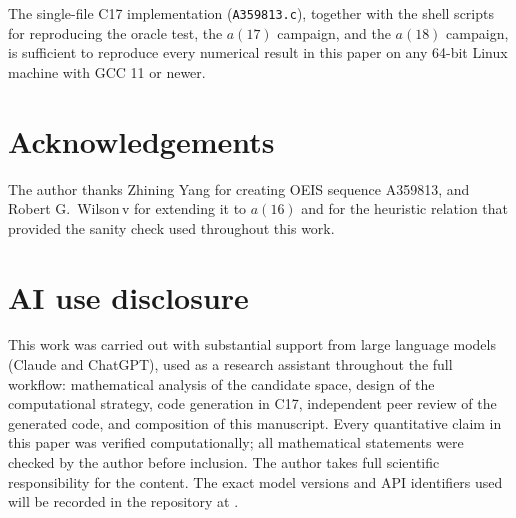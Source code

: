 \documentclass[11pt,a4paper]{article}
\theoremstyle{definition}
\begin{document}
The single-file C17 implementation (\texttt{A359813.c}), together with the
shell scripts for reproducing the oracle test, the $a(17)$ campaign, and
the $a(18)$ campaign, is sufficient to reproduce every numerical result
in this paper on any 64-bit Linux machine with GCC 11 or newer.

\section*{Acknowledgements}

The author thanks Zhining Yang for creating OEIS sequence A359813,
and Robert G.\ Wilson\,v for extending it to $a(16)$ and for the
heuristic relation that provided the sanity check used throughout this
work.

\section*{AI use disclosure}

This work was carried out with substantial support from large language
models (Claude and ChatGPT), used as a research assistant
throughout the full workflow: mathematical analysis of the candidate
space, design of the computational strategy, code generation in C17,
independent peer review of the generated code, and composition of this
manuscript. Every quantitative claim in this paper was verified
computationally; all mathematical statements were checked by the author
before inclusion. The author takes full scientific responsibility for the
content. The exact model versions and API identifiers used will be
recorded in the repository at \cite{Repo}.
\end{document}
